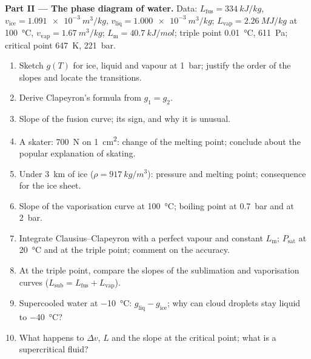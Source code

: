 \begin{problem}
\textbf{Part II --- The phase diagram of water.}
Data: $L_{\text{fus}} = \qty{334}{kJ/kg}$, $v_{\text{ice}} = \qty{1.091e-3}{m^3/kg}$,
$v_{\text{liq}} = \qty{1.000e-3}{m^3/kg}$; $L_{\text{vap}} = \qty{2.26}{MJ/kg}$ at
\qty{100}{\celsius}, $v_{\text{vap}} = \qty{1.67}{m^3/kg}$; $L_{\text{m}} = \qty{40.7}{kJ/mol}$;
triple point \qty{0.01}{\celsius}, \qty{611}{Pa}; critical point \qty{647}{K},
\qty{221}{bar}.
\begin{enumerate}[resume]
  \item Sketch $g(T)$ for ice, liquid and vapour at \qty{1}{bar}; justify
        the order of the slopes and locate the transitions.
  \item Derive Clapeyron's formula from $g_1 = g_2$.
  \item Slope of the fusion curve; its sign, and why it is unusual.
  \item A skater: \qty{700}{N} on \qty{1}{cm^2}: change of the melting
        point; conclude about the popular explanation of skating.
  \item Under \qty{3}{km} of ice ($\rho = \qty{917}{kg/m^3}$): pressure and
        melting point; consequence for the ice sheet.
  \item Slope of the vaporisation curve at \qty{100}{\celsius}; boiling
        point at \qty{0.7}{bar} and at \qty{2}{bar}.
  \item Integrate Clausius--Clapeyron with a perfect vapour and
        constant $L_{\text{m}}$; $P_{\text{sat}}$ at \qty{20}{\celsius} and at
        the triple point; comment on the accuracy.
  \item At the triple point, compare the slopes of the sublimation and
        vaporisation curves ($L_{\text{sub}} = L_{\text{fus}} + L_{\text{vap}}$).
  \item Supercooled water at \qty{-10}{\celsius}: $g_{\text{liq}} - g_{\text{ice}}$;
        why can cloud droplets stay liquid to \qty{-40}{\celsius}?
  \item What happens to $\Delta v$, $L$ and the slope at the critical
        point; what is a supercritical fluid?
\end{enumerate}


\end{problem}

